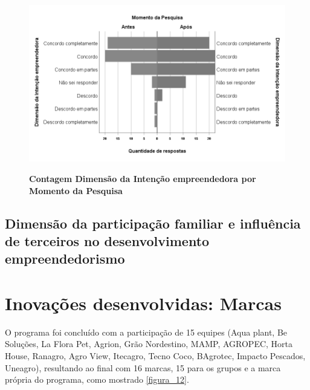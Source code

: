 \begin{figure}[H]
\centering
\caption{\textbf{Contagem Dimensão da Intenção empreendedora  por Momento da Pesquisa}}
\includegraphics[scale=0.6]{Imagens/intencao_empreendedora.png}
\label{figura_45}
\end{figure}


\subsection{Dimensão da participação familiar e influência de terceiros no desenvolvimento empreendedorismo}



\section{Inovações desenvolvidas: Marcas}
\label{inovacoes}

O programa foi concluído  com a participação de 15 equipes (Aqua plant, Be Soluções, La Flora Pet, Agrion, Grão Nordestino, MAMP, AGROPEC, Horta House, Ranagro, Agro View, Itecagro, Tecno Coco, BAgrotec, Impacto Pescados, Uneagro), resultando ao final com 16 marcas, 15 para os grupos e a marca própria do programa, como mostrado  \ref{figura_12}.

